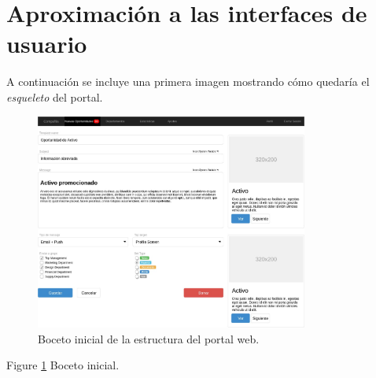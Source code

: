 \section{Aproximación a las interfaces de usuario}
\par A continuación se incluye una primera imagen mostrando cómo quedaría el \textit{esqueleto} del portal.

\begin{figure}
  \centering
    \includegraphics[width=0.8\textwidth]{img/esqueletoportalweb.jpg}
  \caption{Boceto inicial de la estructura del portal web.}
  \label{fig:bocetoportalweb}
\end{figure}
Figure \ref{fig:bocetoportalweb} Boceto inicial.